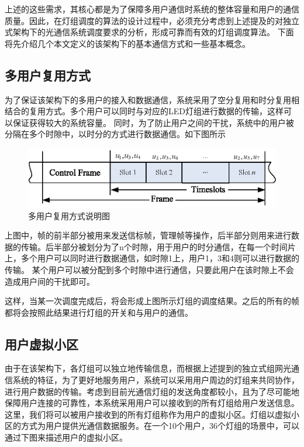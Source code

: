 上述的这些需求，其核心都是为了保障多用户通信时系统的整体容量和用户的通信质量。因此，在灯组调度的算法的设计过程中，必须充分考虑到上述提及的对独立式架构下的光通信系统调度要求的分析，形成可靠而有效的灯组调度算法。
下面将先介绍几个本文定义的该架构下的基本通信方式和一些基本概念。

\subsection{多用户复用方式}
为了保证该架构下的多用户的接入和数据通信，系统采用了空分复用和时分复用相结合的复用方式。多个用户可以同时与对应的LED灯组进行数据的传输，这样可以保证获得较大的系统容量。
同时，为了防止用户之间的干扰，系统中的用户被分隔在多个时隙中，以时分的方式进行数据通信。如下图所示

\begin{figure}[htbp]
    \centering
	\includegraphics[width=\textwidth]{figures/chapter-5/IssMultiUserComm.eps}
	\caption{多用户复用方式说明图}
	\label{fig:iss-multi-user-comm}
\end{figure}

上图中，帧的前半部分被用来发送信标帧，管理帧等操作，后半部分则用来进行数据的传输。后半部分被划分为了n个时隙，用于用户的时分通信，在每一个时间片上，多个用户可以同时进行数据通信，如时隙1上，用户1，3和4则可以进行数据的传输。
某个用户可以被分配到多个时隙中进行通信，只要此用户在该时隙上不会造成用户间的干扰即可。

这样，当某一次调度完成后，将会形成上图所示灯组的调度结果。之后的所有的帧都将会按照此结果进行灯组的开关和与用户的通信。

\subsection{用户虚拟小区}
由于在该架构下，各灯组可以独立地传输信息，而根据上述提到的独立式组网光通信系统的特征，为了更好地服务用户，系统可以采用用户周边的灯组来共同协作，进行用户数据的传输。考虑到目前光通信灯组的发送角度都较小，且为了尽可能地保障用户连接的可靠性，本系统采用用户可以接收到的所有灯组给用户发送信息。
这里，我们将可以被用户接收到的所有灯组称作为用户的虚拟小区。灯组以虚拟小区的方式为用户提供光通信数据服务。在一个10个用户，36个灯组的场景中，可以通过下图来描述用户的虚拟小区。

